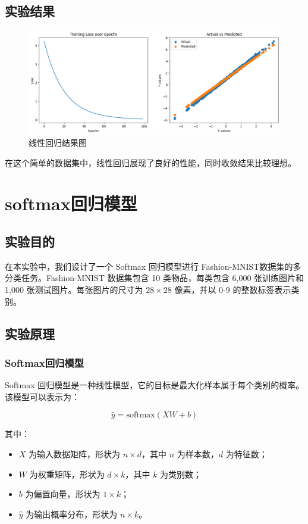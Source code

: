 \documentclass[a4paper,12pt]{article}
\begin{document}
\subsection{实验结果}
\begin{figure}[htbp]
	\centering
	\includegraphics[width=1\textwidth]{1.png}
	\caption{线性回归结果图}
\end{figure}
在这个简单的数据集中，线性回归展现了良好的性能，同时收敛结果比较理想。



\section{softmax回归模型}
\subsection{实验目的}
	在本实验中，我们设计了一个 Softmax 回归模型进行 Fashion-MNIST数据集的多分类任务。Fashion-MNIST 数据集包含 10 类物品，每类包含 6,000 张训练图片和 1,000 张测试图片。每张图片的尺寸为 $28 \times 28$ 像素，并以 0-9 的整数标签表示类别。

\subsection{实验原理}
\subsubsection{Softmax回归模型}
Softmax 回归模型是一种线性模型，它的目标是最大化样本属于每个类别的概率。该模型可以表示为：

\begin{equation}
	\hat{y} = \text{softmax}(XW + b)
\end{equation}

其中：
\begin{itemize}
	\item $X$ 为输入数据矩阵，形状为 $n \times d$，其中 $n$ 为样本数，$d$ 为特征数；
	\item $W$ 为权重矩阵，形状为 $d \times k$，其中 $k$ 为类别数；
	\item $b$ 为偏置向量，形状为 $1 \times k$；
	\item $\hat{y}$ 为输出概率分布，形状为 $n \times k$。
\end{itemize}
\end{document}
